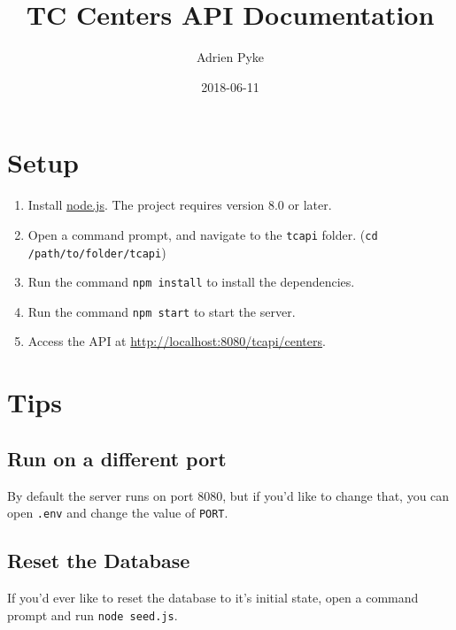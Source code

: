 \documentclass{article}
\title{TC Centers API Documentation}
\date{2018-06-11}
\author{Adrien Pyke}
\begin{document}
	\maketitle
	\newpage

	\section{Setup}
	\begin{enumerate}
		\item Install \href{https://nodejs.org/en/}{node.js}. The project requires version 8.0 or later.
		\item Open a command prompt, and navigate to the \texttt{tcapi} folder. (\texttt{cd /path/to/folder/tcapi})
		\item Run the command \texttt{npm install} to install the dependencies.
		\item Run the command \texttt{npm start} to start the server.
		\item Access the API at \url{http://localhost:8080/tcapi/centers}.
	\end{enumerate}

	\section{Tips}

	\subsection{Run on a different port}
	By default the server runs on port 8080, but if you'd like to change that, you can open \texttt{.env} and change the value of \texttt{PORT}.

	\subsection{Reset the Database}
	If you'd ever like to reset the database to it's initial state, open a command prompt and run \texttt{node seed.js}.

	\newpage
\end{document}
